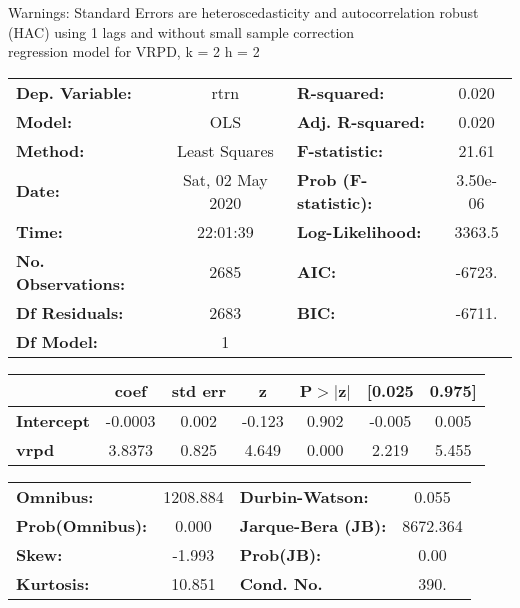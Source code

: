 Warnings: \newline
 [1] Standard Errors are heteroscedasticity and autocorrelation robust (HAC) using 1 lags and without small sample correction\\ 

regression model for VRPD, k = 2 h = 2\begin{center}
\begin{tabular}{lclc}
\toprule
\textbf{Dep. Variable:}    &       rtrn       & \textbf{  R-squared:         } &     0.020   \\
\textbf{Model:}            &       OLS        & \textbf{  Adj. R-squared:    } &     0.020   \\
\textbf{Method:}           &  Least Squares   & \textbf{  F-statistic:       } &     21.61   \\
\textbf{Date:}             & Sat, 02 May 2020 & \textbf{  Prob (F-statistic):} &  3.50e-06   \\
\textbf{Time:}             &     22:01:39     & \textbf{  Log-Likelihood:    } &    3363.5   \\
\textbf{No. Observations:} &        2685      & \textbf{  AIC:               } &    -6723.   \\
\textbf{Df Residuals:}     &        2683      & \textbf{  BIC:               } &    -6711.   \\
\textbf{Df Model:}         &           1      & \textbf{                     } &             \\
\bottomrule
\end{tabular}
\begin{tabular}{lcccccc}
                   & \textbf{coef} & \textbf{std err} & \textbf{z} & \textbf{P$> |$z$|$} & \textbf{[0.025} & \textbf{0.975]}  \\
\midrule
\textbf{Intercept} &      -0.0003  &        0.002     &    -0.123  &         0.902        &       -0.005    &        0.005     \\
\textbf{vrpd}      &       3.8373  &        0.825     &     4.649  &         0.000        &        2.219    &        5.455     \\
\bottomrule
\end{tabular}
\begin{tabular}{lclc}
\textbf{Omnibus:}       & 1208.884 & \textbf{  Durbin-Watson:     } &    0.055  \\
\textbf{Prob(Omnibus):} &   0.000  & \textbf{  Jarque-Bera (JB):  } & 8672.364  \\
\textbf{Skew:}          &  -1.993  & \textbf{  Prob(JB):          } &     0.00  \\
\textbf{Kurtosis:}      &  10.851  & \textbf{  Cond. No.          } &     390.  \\
\bottomrule
\end{tabular}
\end{center}

